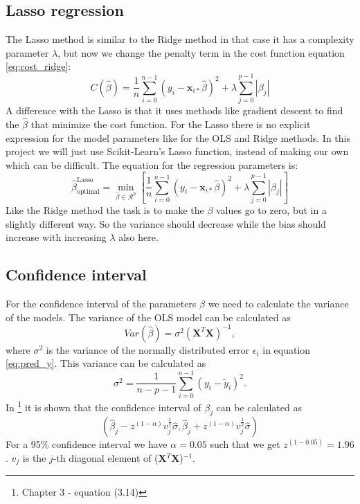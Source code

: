 \documentclass[12pt,a4paper,english]{article}
\begin{document}
\subsection{Lasso regression}
The Lasso method is similar to the Ridge method in that case it has a complexity parameter $\lambda$, but now we change the penalty term in the cost function equation \ref{eq:cost_ridge}:
\begin{equation}
\label{eq:cost_lasso}
C(\hat{\beta})=\frac{1}{n}\sum_{i=0}^{n-1}(y_i-\textbf{x}_{i*}\hat{\beta})^2+\lambda\sum_{j=0}^{p-1}|\beta_j|
\end{equation}
A difference with the Lasso is that it uses methods like gradient descent to find the $\hat{\beta}$ that minimize the cost function. For the Lasso there is no explicit expression for the model parameters like for the OLS and Ridge methods. In this project we will just use Scikit-Learn's Lasso function, instead of making our own which can be difficult. The equation for the regression parameters is:
\begin{equation}
\label{eq:beta_opt_Lasso}
\hat{\beta}_{\text{optimal}}^{\text{Lasso}}=\min_{\hat{\beta}\in \mathcal{R}^p}\left[\frac{1}{n}\sum_{i=0}^{n-1}(y_i-\textbf{x}_{i*}\hat{\beta})^2+\lambda\sum_{j=0}^{p-1}|\beta_j|\right]
\end{equation} 
Like the Ridge method the task is to make the $\beta$ values go to zero, but in a slightly different way. So the variance should decrease while the bias should increase with increasing $\lambda$ also here.

\subsection{Confidence interval}
For the confidence interval of the parameters $\beta$ we need to calculate the variance of the models. The variance of the OLS model can be calculated as
\begin{equation}
\label{eq:var_ols}
Var(\hat{\beta})=\sigma^2(\textbf{X}^T\textbf{X})^{-1},
\end{equation}
where $\sigma^2$ is the variance of the normally distributed error $\epsilon_i$ in equation \ref{eq:pred_y}. This variance can be calculated as
\begin{equation}
\label{eq:sigma}
\sigma^2 = \frac{1}{n-p-1}\sum_{i=0}^{n-1}(y_i-\tilde{y}_i)^2.
\end{equation}
In \citet{hastie2009}\footnote{Chapter 3 - equation (3.14)} it is shown that the confidence interval of $\beta_j$ can be calculated as 
\begin{equation}
\label{eq:conf_int}
(\hat{\beta}_j-z^{(1-\alpha)}v_j^{\frac{1}{2}}\hat{\sigma}, \hat{\beta}_j+z^{(1-\alpha)}v_j^{\frac{1}{2}}\hat{\sigma})
\end{equation}
For a 95\% confidence interval we have $\alpha=0.05$ such that we get $z^{(1-0.05)}=1.96$. $v_j$ is the $j$-th diagonal element of (\textbf{X}$^T$\textbf{X})$^{-1}$.
\end{document}
